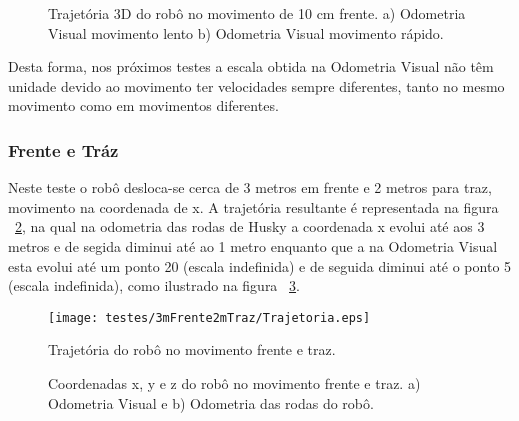 \begin{figure}[h!]
	\centering
	\qquad
	\caption{Trajetória 3D do robô no movimento de 10 cm frente. a) Odometria Visual movimento lento b) Odometria Visual movimento rápido.}
	\label{fig:traj3D10cm}
\end{figure}




\FloatBarrier
Desta forma, nos próximos testes a escala obtida na Odometria Visual não têm unidade devido ao movimento ter velocidades sempre diferentes, tanto no mesmo movimento como em movimentos diferentes. 



\FloatBarrier
\subsubsection{Frente e Tráz}\label{subsubsection:EmFrenteTraz}

Neste teste o robô desloca-se cerca de 3 metros em frente e 2 metros para traz, movimento na coordenada de x. A trajetória resultante é representada na figura ~\ref{fig:trajRobo3mFrente2mTraz}, na qual na odometria das rodas de Husky a coordenada x evolui até aos 3 metros e de segida diminui até ao 1 metro enquanto que a na Odometria Visual esta evolui até um ponto 20 (escala indefinida) e de seguida diminui até o ponto 5 (escala indefinida), como ilustrado na figura ~\ref{fig:pos3mFrente2mTraz}.


\begin{figure}[h!]
	\begin{center}
		\leavevmode		
		\texttt{[image: testes/3mFrente2mTraz/Trajetoria.eps]}
		\caption{Trajetória do robô no movimento frente e traz.}
		\label{fig:trajRobo3mFrente2mTraz}
	\end{center}
\end{figure}



\begin{figure}[h!]
	\centering
	\qquad
	\caption{Coordenadas x, y e z do robô  no movimento frente e traz. a) Odometria Visual e b) Odometria das rodas do robô.}
	\label{fig:pos3mFrente2mTraz}
\end{figure}

